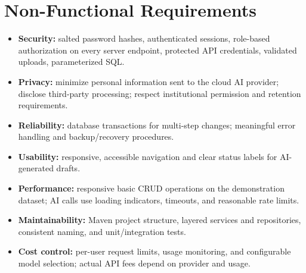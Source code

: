 \documentclass[11pt,a4paper]{article}
\begin{document}
\section{Non-Functional Requirements}
\begin{itemize}[leftmargin=*]
\item \textbf{Security:} salted password hashes, authenticated sessions, role-based authorization on every server endpoint, protected API credentials, validated uploads, parameterized SQL.
\item \textbf{Privacy:} minimize personal information sent to the cloud AI provider; disclose third-party processing; respect institutional permission and retention requirements.
\item \textbf{Reliability:} database transactions for multi-step changes; meaningful error handling and backup/recovery procedures.
\item \textbf{Usability:} responsive, accessible navigation and clear status labels for AI-generated drafts.
\item \textbf{Performance:} responsive basic CRUD operations on the demonstration dataset; AI calls use loading indicators, timeouts, and reasonable rate limits.
\item \textbf{Maintainability:} Maven project structure, layered services and repositories, consistent naming, and unit/integration tests.
\item \textbf{Cost control:} per-user request limits, usage monitoring, and configurable model selection; actual API fees depend on provider and usage.
\end{itemize}
\end{document}
